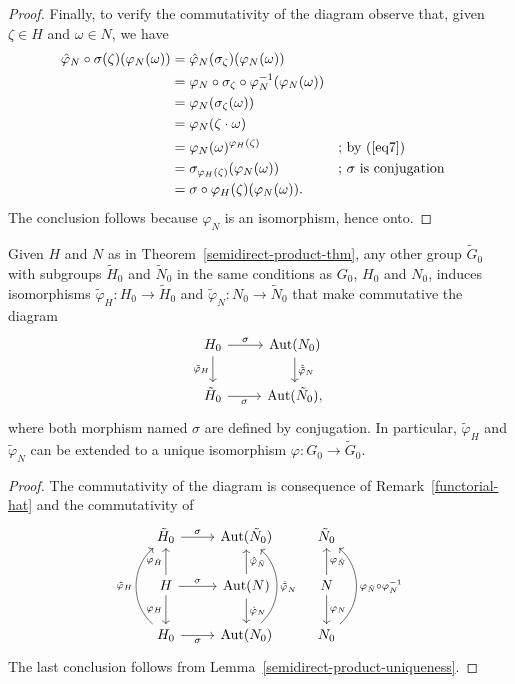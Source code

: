 \begin{proof}
Finally, to verify the commutativity of the diagram observe that, given $\zeta\in H$ and $\omega\in N$, we have
\begin{align*}
    \hat\varphi_N\circ\sigma(\zeta)(\varphi_N(\omega))
        &= \hat\varphi_N(\sigma_\zeta)(\varphi_N(\omega))\\
        &= \varphi_N\circ\sigma_\zeta\circ\varphi_N^{-1}(\varphi_N(\omega))\\
        &= \varphi_N(\sigma_\zeta(\omega))\\
        &= \varphi_N(\zeta\cdot\omega)\\
        &= \varphi_N(\omega)^{\varphi_H(\zeta)}
            &&\text{; by $(\ref{eq7})$}\\
        &= \sigma_{\varphi_H(\zeta)}(\varphi_N(\omega))
            &&\text{; $\sigma$ is conjugation}\\
        &= \sigma\circ\varphi_H(\zeta)(\varphi_N(\omega)).
\end{align*}
The conclusion follows because $\varphi_N$ is an isomorphism, hence onto.  \end{proof}

\begin{cor}
    Given $H$ and $N$ as in {\rm Theorem~\ref{semidirect-product-thm}}, any other group $\tilde G_0$ with subgroups $\tilde H_0$ and $\tilde N_0$ in the same conditions as $G_0$, $H_0$ and $N_0$, induces isomorphisms $\tilde\varphi_H\colon H_0\to\tilde H_0$ and $\tilde\varphi_N\colon N_0\to\tilde N_0$ that make commutative the diagram
    $$
        \begin{tikzcd}
            H_0\arrow[r,"\sigma"]\arrow[d,"\tilde\varphi_H"']
                &\Aut(N_0)\arrow[d,"\hat{\tilde\varphi}_N"]
                \\
            \tilde H_0\arrow[r,"\sigma"']
                &\Aut(\tilde N_0),
        \end{tikzcd}
    $$
    where both morphism named\/ $\sigma$ are defined by conjugation. In particular, $\tilde\varphi_H$ and $\tilde\varphi_N$ can be extended to a unique isomorphism $\varphi\colon G_0\to\tilde G_0$.
\end{cor}

\begin{proof} The commutativity of the diagram is consequence of Remark~\ref{functorial-hat} and the commutativity of
$$
    \begin{tikzcd}
        \tilde H_0\arrow[r,"\sigma"]
            &\Aut(\tilde N_0)
            &\tilde N_0 \\
        H\arrow[d,"\varphi_H"']\arrow[r,"\sigma"]\arrow[u,"\varphi_{\tilde{H}}"]
            &\Aut(N)\arrow[d,"\hat{\varphi}_N"]\arrow[u,"\hat{\varphi}_{\tilde{N}}"']
            &N\arrow[u,"\varphi_{\tilde{N}}"']\arrow[d,"\varphi_N"] \\
        H_0\arrow[r,"\sigma"']\arrow[uu,"\tilde{\varphi}_H",bend left=49]
            &\Aut(N_0)\arrow[uu,"{\hat{\tilde{\varphi}}}_N"',bend right=49]
        &N_0\arrow[uu,"\varphi_{\tilde{N}}\circ\varphi_N^{-1}"',bend right=49]
    \end{tikzcd}
$$
The last conclusion follows from Lemma~\ref{semidirect-product-uniqueness}.  \end{proof}

